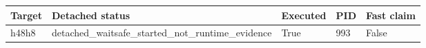 {\small
\begin{tabular}{lllll}
\hline
Target & Detached status & Executed & PID & Fast claim \\
\hline
h48h8 & detached\_waitsafe\_started\_not\_runtime\_evidence & True & 993 & False \\
\hline
\end{tabular}
}
